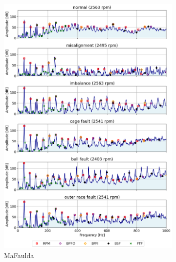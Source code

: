 \documentclass{llncs}
\begin{document}
\begin{figure}
     \begin{subfigure}[b]{0.3\textwidth}
         \centering
         \includegraphics[width=\textwidth]{fig/spectrum/mafaulda-fault.png}
         \caption{MaFaulda}
         \label{fig:mafaulda-fault}
     \end{subfigure}
     \hfill
     \begin{subfigure}[b]{0.3\textwidth}
         \centering

\end{subfigure}
\end{figure}
\end{document}

